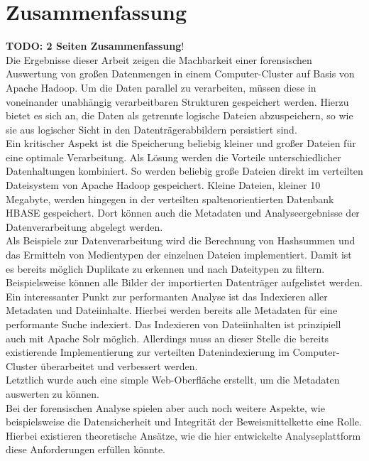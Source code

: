\chapter{Zusammenfassung}
\label{ch:zusammenfassung}
\textbf{TODO: 2 Seiten Zusammenfassung}!\\
Die Ergebnisse dieser Arbeit zeigen die Machbarkeit einer forensischen Auswertung von großen Datenmengen in einem Computer-Cluster auf Basis von Apache Hadoop. Um die Daten parallel zu verarbeiten, müssen diese in voneinander unabhängig verarbeitbaren Strukturen gespeichert werden. Hierzu bietet es sich an, die Daten als getrennte logische Dateien abzuspeichern, so wie sie aus logischer Sicht in den Datenträgerabbildern persistiert sind.\\
Ein kritischer Aspekt ist die Speicherung beliebig kleiner und großer Dateien für eine optimale Verarbeitung. Als Lösung werden die Vorteile unterschiedlicher Datenhaltungen kombiniert. So werden beliebig große Dateien direkt im verteilten Dateisystem von Apache Hadoop gespeichert. Kleine Dateien, kleiner 10 Megabyte, werden hingegen in der verteilten spaltenorientierten Datenbank HBASE gespeichert. Dort können auch die Metadaten und Analyseergebnisse der Datenverarbeitung abgelegt werden.\\

\noindent
Als Beispiele zur Datenverarbeitung wird die Berechnung von Hashsummen und das Ermitteln von Medientypen der einzelnen Dateien implementiert. Damit ist es bereits möglich Duplikate zu erkennen und nach Dateitypen zu filtern. Beispielsweise können alle Bilder der importierten Datenträger aufgelistet werden.\\
Ein interessanter Punkt zur performanten Analyse ist das Indexieren aller Metadaten und Dateiinhalte. Hierbei werden bereits alle Metadaten für eine performante Suche indexiert. Das Indexieren von Dateiinhalten ist prinzipiell auch mit Apache Solr möglich. Allerdings  muss an dieser Stelle die bereits existierende Implementierung zur verteilten Datenindexierung im Computer-Cluster überarbeitet und verbessert werden.\\

\noindent
Letztlich wurde auch eine simple Web-Oberfläche erstellt, um die Metadaten auswerten zu können.\\
Bei der forensischen Analyse spielen aber auch noch weitere Aspekte, wie beispielsweise die Datensicherheit und Integrität der Beweismittelkette eine Rolle. Hierbei existieren theoretische Ansätze, wie die hier entwickelte Analyseplattform diese Anforderungen erfüllen könnte.\\

